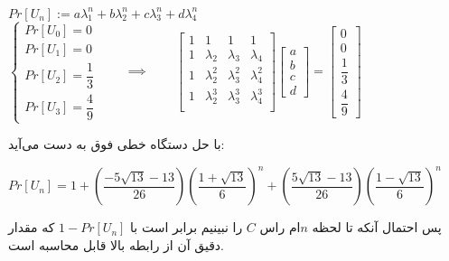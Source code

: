 \documentclass{scribe-cgenomics}
\begin{document}
\begin{حل}
\begin{center}
$
Pr[U_n] := a\lambda_1^n + b\lambda_2^n + c\lambda_3^n + d\lambda_4^n
$
\bigbreak
$
\begin{cases}
Pr[U_0] = 0 \\
Pr[U_1] = 0 \\
Pr[U_2] = \dfrac{1}{3}\\
Pr[U_3] = \dfrac{4}{9}
\end{cases}
\qquad \implies \qquad
\begin{bmatrix}
1 & 1 & 1 & 1\\
1 & \lambda_2 & \lambda_3 & \lambda_4\\
1 & \lambda_2^2 & \lambda_3^2 & \lambda_4^2\\
1 & \lambda_2^3 & \lambda_3^3 & \lambda_4^3\\
\end{bmatrix}
\begin{bmatrix}
a \\ b \\ c \\ d
\end{bmatrix} = 
\begin{bmatrix}
0 \\ 0 \\ \dfrac{1}{3} \\ \dfrac{4}{9}
\end{bmatrix}
$
\end{center}

با حل دستگاه خطی فوق به دست می‌آید:

\begin{center}
$
Pr[U_n] = 1 + (\dfrac{-5\sqrt{13} - 13}{26})(\dfrac{1 + \sqrt{13}}{6})^n +  (\dfrac{5\sqrt{13} - 13}{26})(\dfrac{1 - \sqrt{13}}{6})^n
$
\end{center}

پس احتمال آنکه تا لحظه
$n$ام
راس
$C$
را نبینیم برابر است با
$1-Pr[U_n]$
که مقدار دقیق آن از رابطه بالا قابل محاسبه است.


\end{حل}

\newpage
\begin{prob}
\end{prob}
\end{document}
